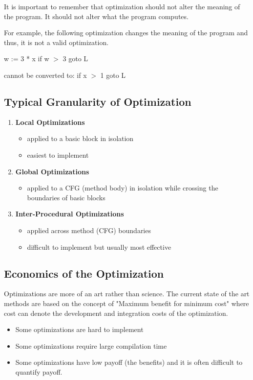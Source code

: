 It is important to remember that optimization should not alter the meaning of the program. It should not alter what the program computes.

For example, the following optimization changes the meaning of the program and thus, it is not a valid optimization.

w := 3 * x
if w \(>\) 3 goto L  

cannot be converted to: if x \(>\) 1 goto L

\subsection{Typical Granularity of Optimization}

\begin{enumerate}
    \item \textbf{Local Optimizations}
    \begin{itemize}
        \item applied to a basic block in isolation
        \item easiest to implement
    \end{itemize}
    
    \item \textbf{Global Optimizations}
    \begin{itemize}
        \item applied to a CFG (method body) in isolation while crossing the boundaries of basic blocks
    \end{itemize}
        
    \item \textbf{Inter-Procedural Optimizations}
    \begin{itemize}
        \item applied across method (CFG) boundaries
        \item difficult to implement but usually most effective
    \end{itemize}
\end{enumerate}

\subsection{Economics of the Optimization}

Optimizations are more of an art rather than science. The current state of the art methods are based on the concept of "Maximum benefit for minimum cost" where cost can denote the development and integration costs of the optimization.

\begin{itemize}
    \item Some optimizations are hard to implement
    \item Some optimizations require large compilation time
    \item Some optimizations have low payoff (the benefits) and it is often difficult to quantify payoff.
\end{itemize}

